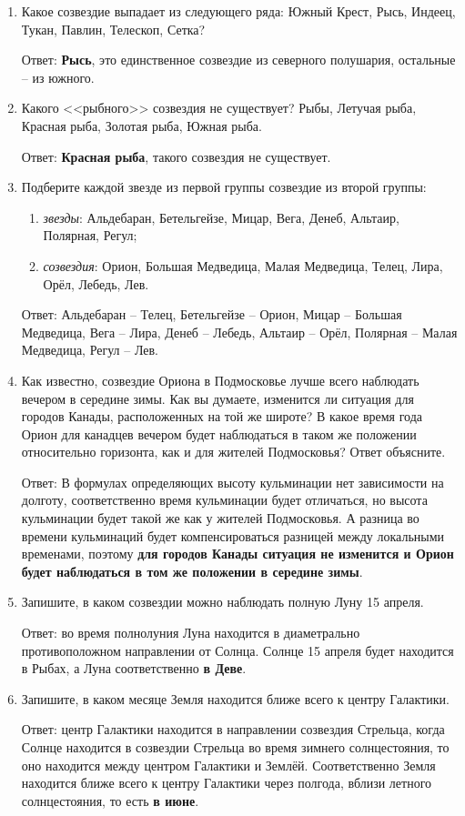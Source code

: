 \begin{enumerate}
    \item Какое созвездие выпадает из следующего ряда: Южный Крест, Рысь, Индеец, Тукан, Павлин, Телескоп, Сетка?
    
    Ответ: \textbf{Рысь}, это единственное созвездие из северного полушария, остальные -- из южного.
    \item Какого <<рыбного>> созвездия не существует? Рыбы, Летучая рыба, Красная рыба, Золотая рыба, Южная рыба.

    Ответ: \textbf{Красная рыба}, такого созвездия не существует.
    \item Подберите каждой звезде из первой группы созвездие из второй группы:
    \begin{enumerate}[label=\alph*.]
        \item \textit{звезды}: Альдебаран, Бетельгейзе, Мицар, Вега, Денеб, Альтаир, Полярная, Регул;
        \item \textit{созвездия}: Орион, Большая Медведица, Малая Медведица, Телец, Лира, Орёл, Лебедь, Лев.
    \end{enumerate}

    Ответ:
    Альдебаран -- Телец, Бетельгейзе -- Орион, Мицар -- Большая Медведица, Вега -- Лира, Денеб -- Лебедь, Альтаир -- Орёл, Полярная -- Малая Медведица, Регул -- Лев.
    \item Как известно, созвездие Ориона в Подмосковье лучше всего наблюдать вечером в середине зимы. Как вы думаете, изменится ли ситуация для городов Канады, расположенных на той же широте? В какое время года Орион для канадцев вечером будет наблюдаться в таком же положении относительно горизонта, как и для жителей Подмосковья? Ответ объясните.

    Ответ: В формулах определяющих высоту кульминации нет зависимости на долготу, соответственно время кульминации будет отличаться, но высота кульминации будет такой же как у жителей Подмосковья. А разница во времени кульминаций будет компенсироваться разницей между локальными временами, поэтому \textbf{для городов Канады ситуация не изменится и Орион будет наблюдаться в том же положении в середине зимы}.
    \item Запишите, в каком созвездии можно наблюдать полную Луну 15 апреля.

    Ответ: во время полнолуния Луна находится в диаметрально противоположном направлении от Солнца. Солнце 15 апреля будет находится в Рыбах, а Луна соответственно \textbf{в Деве}.
    \item Запишите, в каком месяце Земля находится ближе всего к центру Галактики.

    Ответ: центр Галактики находится в направлении созвездия Стрельца, когда Солнце находится в созвездии Стрельца во время зимнего солнцестояния, то оно находится между центром Галактики и Землёй. Соответственно Земля находится ближе всего к центру Галактики через полгода, вблизи летного солнцестояния, то есть \textbf{в июне}.
\end{enumerate}
